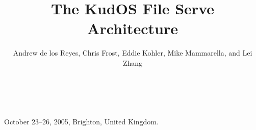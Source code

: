 \documentclass[10pt,twocolumn]{article}
\begin{document}
\normalsize
{} {October 23--26, 2005, Brighton, United Kingdom.}

\title{\sffamily\textbf{The KudOS File Serve Architecture}}


\author{\sffamily Andrew de los Reyes, Chris Frost, Eddie Kohler, Mike
Mammarella, and Lei Zhang \\
\noalign{\vskip2pt}
 \\
\noalign{\vskip2pt}
 \\
\noalign{\vskip-.25in}
\null}
\date{}
\maketitle

\def\assast{\raise.2ex\hbox{$^\ast$}}









\end{document}
